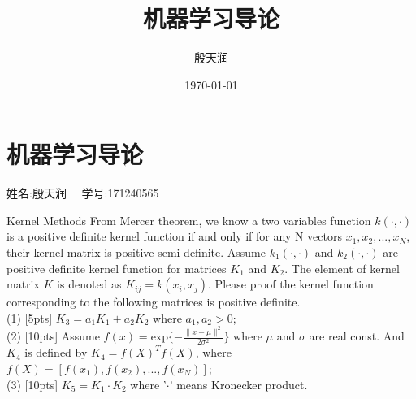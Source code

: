 \documentclass[11pt, a4paper, UTF8]{ctexart}
\title{机器学习导论}
\author{殷天润}
\date{\today}
\begin{document}
                                                                                                                

\section {机器学习导论}

\begin{center} 姓名:殷天润 ~~学号:171240565\end{center}
\begin{problem}[ML problem 1]
	[25pts] Kernel Methods
From Mercer theorem, we know a two variables function $k(\cdot,\cdot)$ is a positive definite kernel function if and only if for any N vectors $x_1,x_2,...,x_N$, their kernel matrix is positive semi-definite. Assume $k_1(\cdot,\cdot)$ and $k_2(\cdot,\cdot)$ are positive definite kernel function for matrices $K_1$ and $K_2$. The element of kernel matrix $K$ is denoted as $K_{ij}=k(x_i,x_j)$. Please proof the kernel function corresponding to the following matrices is positive definite.\\
(1) [5pts] $K_3=a_1 K_1+a_2 K_2$ where $a_1,a_2>0$;\\
(2) [10pts] Assume $f(x)=\text{exp}\{-\frac{\|x-\mu\|^2}{2\sigma^2}\}$ where $\mu$ and $\sigma$ are real const. And $K_4$ is defined by $K_4=f(X)^T f(X)$, where $f(X)=[f(x_1),f(x_2),...,f(x_N)]$;\\
(3) [10pts] $K_5=K_1\cdot K_2$ where '$\cdot$' means Kronecker product.\\
\end{problem}
\end{document}
